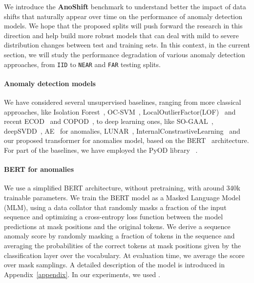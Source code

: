 \documentclass{article}
\begin{document}
    We introduce the \textbf{AnoShift} benchmark to understand better the impact of data shifts that naturally appear over time on the performance of anomaly detection models. We hope that the proposed splits will push forward the research in this direction and help build more robust models that can deal with mild to severe distribution changes between test and training sets. In this context, in the current section, we will study the performance degradation of various anomaly detection approaches, from \texttt{IID} to \texttt{NEAR} and \texttt{FAR} testing splits.
    
    \paragraph{Anomaly detection models} We have considered several unsupervised baselines, ranging from more classical approaches, like Isolation Forest~\cite{isoforest}, OC-SVM~\cite{ocsvm}, LocalOutlierFactor(LOF)~\cite{lof} and recent ECOD~\cite{ecod} and COPOD~\cite{copod}, to deep learning ones, like SO-GAAL~\cite{mo_gaal}, deepSVDD~\cite{deepsvdd}, AE~\cite{autoencoder} for anomalies, LUNAR~\cite{lunar}, InternalConstrastiveLearning~\cite{icl} and our proposed transformer for anomalies model, based on the BERT~\cite{bert} architecture. For part of the baselines, we have employed the PyOD library ~\cite{pyod}.

    \paragraph{BERT for anomalies} We use a simplified BERT architecture, without pretraining, with around 340k trainable parameters. We train the BERT model as a Masked Language Model (MLM), using a data collator that randomly masks a fraction  of the input sequence and optimizing a cross-entropy loss function between the model predictions at mask positions and the original tokens. We derive a sequence anomaly score by randomly masking a fraction  of tokens in the sequence and averaging the probabilities of the correct tokens at mask positions given by the classification layer over the vocabulary. At evaluation time, we average the score over  mask samplings. A detailed description of the model is introduced in Appendix~\ref{appendix}. In our experiments, we used .
    
\end{document}
